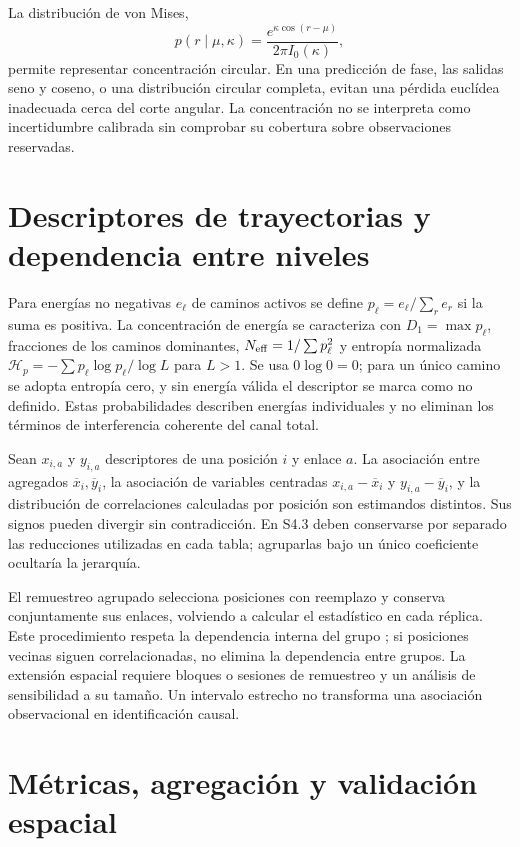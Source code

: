 La distribución de von Mises,
\begin{equation}
p(r\mid\mu,\kappa)=\frac{e^{\kappa\cos(r-\mu)}}{2\pi I_0(\kappa)},
\end{equation}
permite representar concentración circular. En una predicción de fase, las salidas
seno y coseno, o una distribución circular completa, evitan una pérdida euclídea
inadecuada cerca del corte angular. La concentración no se interpreta como incertidumbre
calibrada sin comprobar su cobertura sobre observaciones reservadas.

\section{Descriptores de trayectorias y dependencia entre niveles}
\label{sec:multilevel_foundations}

Para energías no negativas $e_\ell$ de caminos activos se define
$p_\ell=e_\ell/\sum_r e_r$ si la suma es positiva. La concentración de energía se
caracteriza con $D_1=\max p_\ell$, fracciones de los caminos dominantes,
$N_{\rm eff}=1/\sum p_\ell^2$ y entropía normalizada
$\mathcal H_p=-\sum p_\ell\log p_\ell/\log L$ para $L>1$.
Se usa $0\log0=0$; para un único camino se adopta entropía cero, y sin energía válida
el descriptor se marca como no definido. Estas probabilidades describen energías
individuales y no eliminan los términos de interferencia coherente del canal total.

Sean $x_{i,a}$ y $y_{i,a}$ descriptores de una posición $i$ y enlace $a$.
La asociación entre agregados $\overline x_i,\overline y_i$, la asociación de variables
centradas $x_{i,a}-\overline x_i$ y $y_{i,a}-\overline y_i$, y la distribución de
correlaciones calculadas por posición son estimandos distintos. Sus signos pueden
divergir sin contradicción. En S4.3 deben conservarse por separado las reducciones
utilizadas en cada tabla; agruparlas bajo un único coeficiente ocultaría la jerarquía.

El remuestreo agrupado selecciona posiciones con reemplazo y conserva conjuntamente
sus enlaces, volviendo a calcular el estadístico en cada réplica. Este procedimiento
respeta la dependencia interna del grupo \citep{Efron1993Bootstrap}; si posiciones
vecinas siguen correlacionadas, no elimina la dependencia entre grupos. La extensión
espacial requiere bloques o sesiones de remuestreo y un análisis de sensibilidad a
su tamaño. Un intervalo estrecho no transforma una asociación observacional en
identificación causal.

\section{Métricas, agregación y validación espacial}

